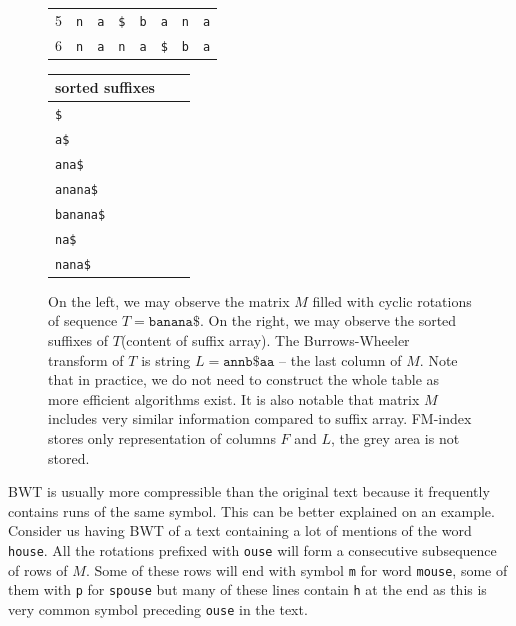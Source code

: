 \begin{figure}
{\begin{tabular}{l|c|ccccc|c|}
	5 & {\tt n}		& \multicolumn{1}{c|}{{\color[HTML]{C0C0C0} \tt a}}		& \multicolumn{1}{c|}{{\color[HTML]{C0C0C0} \tt \$}}& \multicolumn{1}{c|}{{\color[HTML]{C0C0C0} \tt b}}	& \multicolumn{1}{c|}{{\color[HTML]{C0C0C0} \tt a}}	& {\color[HTML]{C0C0C0} \tt n}  & {\tt a}  \\ \cline{2-8} 
	6 & {\tt n}		& \multicolumn{1}{c|}{{\color[HTML]{C0C0C0} \tt a}}		& \multicolumn{1}{c|}{{\color[HTML]{C0C0C0} \tt n}}	& \multicolumn{1}{c|}{{\color[HTML]{C0C0C0} \tt a}}	& \multicolumn{1}{c|}{{\color[HTML]{C0C0C0} \tt \$}}& {\color[HTML]{C0C0C0} \tt b}  & {\tt a}  \\ \cline{2-8} 
	\end{tabular}
	\hspace{4em}
	\begin{tabular}{l l l}
		sorted suffixes\\
	\hline
		\tt \$ \\
		\tt a\$ \\
		\tt ana\$ \\
		\tt anana\$ \\
		\tt banana\$ \\
		\tt na\$ \\
		\tt nana\$ \\
	\end{tabular}
	}
	\caption[TODO]{On the left, we may observe the matrix $M$ filled with cyclic rotations of sequence
	$T = \mathtt{banana\$}$. On the right, we may observe the sorted suffixes of $T$(content of suffix array). The
	Burrows-Wheeler transform of $T$ is string $L=\mathtt{annb\$aa}$ -- the last column of $M$.
	Note that in practice, we do not need to construct the whole table as more efficient algorithms exist.
	It is also notable that matrix $M$ includes very similar information compared to suffix array.
	FM-index stores only representation of columns $F$ and $L$, the grey area is not stored.
	}
	\label{obr:BWT}
\end{figure}

BWT is usually more compressible than the original text because it frequently contains runs of the same
symbol. This can be better explained on an example. Consider us having BWT of a text containing
a lot of mentions of the word {\tt house}. All the rotations prefixed with {\tt ouse} will form a
consecutive subsequence of rows of $M$. Some of these rows will end with symbol {\tt m} for word {\tt mouse},
some of them with {\tt p} for {\tt spouse} but many of these lines contain {\tt h} at the end as this
is very common symbol preceding {\tt ouse} in the text.

